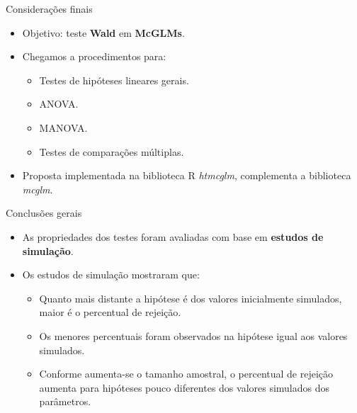 \documentclass[
  ignorenonframetext,
  serif,
  professionalfont,
  usenames,
  dvipsnames,
  aspectratio = 169]{beamer}
\begin{document}
\begin{frame}{Considerações finais}
\protect\hypertarget{considerauxe7uxf5es-finais-1}{}
\begin{itemize}
  \itemsep 2ex
  
  \item Objetivo: teste \textbf{Wald} em \textbf{McGLMs}. 
  \item Chegamos a procedimentos para:
  \begin{itemize}
    \item Testes de hipóteses lineares gerais.
    \item ANOVA.
    \item MANOVA.
    \item Testes de comparações múltiplas. 
  \end{itemize}
  
  \item Proposta implementada na biblioteca R \emph{htmcglm}, complementa a biblioteca \emph{mcglm}.

\end{itemize}
\end{frame}

\begin{frame}{Conclusões gerais}
\protect\hypertarget{conclusuxf5es-gerais}{}
\begin{itemize}
  \itemsep 2ex
  
  \item As propriedades dos testes foram avaliadas com base em \textbf{estudos de simulação}.

  \item Os estudos de simulação mostraram que:

  \begin{itemize}
    \itemsep 2ex
      \item Quanto mais distante a hipótese é dos valores inicialmente simulados, maior é o percentual de rejeição. 
      \item Os menores percentuais foram observados na hipótese igual aos valores simulados.
      \item Conforme aumenta-se o tamanho amostral, o percentual de rejeição aumenta para hipóteses pouco diferentes dos valores simulados dos parâmetros.
  \end{itemize}
\end{itemize}
\end{frame}
\end{document}
